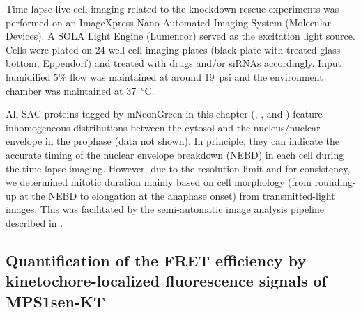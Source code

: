 Time-lapse live-cell imaging related to the knockdown-rescue experiments was performed on an ImageXpress Nano Automated Imaging System (Molecular Devices). A SOLA Light Engine (Lumencor) served as the excitation light source. Cells were plated on 24-well cell imaging plates (black plate with treated glass bottom, Eppendorf) and treated with drugs and/or siRNAs accordingly. Input humidified $5\%$  flow was maintained at around \SI{19}{psi} and the environment chamber was maintained at \SI{37}{\celsius}.

All SAC proteins tagged by mNeonGreen in this chapter (, , and ) feature inhomogeneous distributions between the cytosol and the nucleus/nuclear envelope in the prophase (data not shown). In principle, they can indicate the accurate timing of the nuclear envelope breakdown (NEBD) in each cell during the time-lapse imaging. However, due to the resolution limit and for consistency, we determined mitotic duration mainly based on cell morphology (from rounding-up at the NEBD to elongation at the anaphase onset) from transmitted-light images. This was facilitated by the semi-automatic image analysis pipeline described in . %

\subsection{Quantification of the FRET efficiency by kinetochore-localized fluorescence signals of MPS1sen-KT}
\label{FRETMetricTheory}


